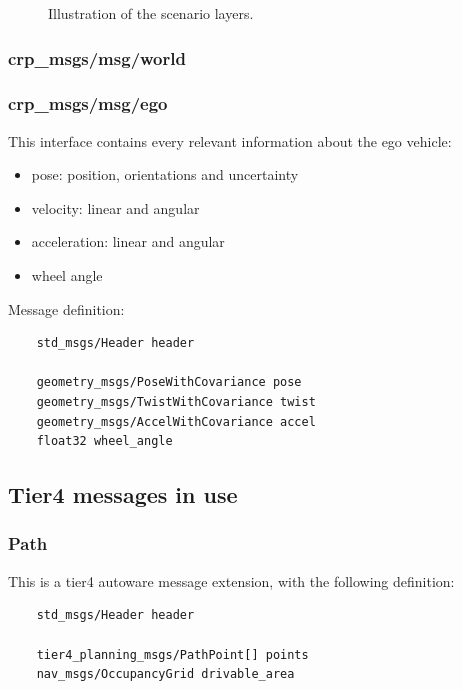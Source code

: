 \documentclass[sn-mathphys-num]{sn-jnl}%
\begin{document}
\begin{figure}[h]
    \caption{Illustration of the scenario layers.}
    \label{fig:scenario}
\end{figure}

\subsubsection{crp\_msgs/msg/world}

\subsubsection{crp\_msgs/msg/ego}
This interface contains every relevant information about the ego vehicle:
\begin{itemize}
    \item pose: position, orientations and uncertainty
    \item velocity: linear and angular
    \item acceleration: linear and angular
    \item wheel angle
\end{itemize}
Message definition:
\begin{lstlisting}
    std_msgs/Header header

    geometry_msgs/PoseWithCovariance pose
    geometry_msgs/TwistWithCovariance twist
    geometry_msgs/AccelWithCovariance accel
    float32 wheel_angle
\end{lstlisting}

\subsection{Tier4 messages in use}
\subsubsection{Path}
This is a tier4 autoware message extension, with the following definition:
\begin{lstlisting}
    std_msgs/Header header

    tier4_planning_msgs/PathPoint[] points
    nav_msgs/OccupancyGrid drivable_area
\end{lstlisting}
\end{document}
